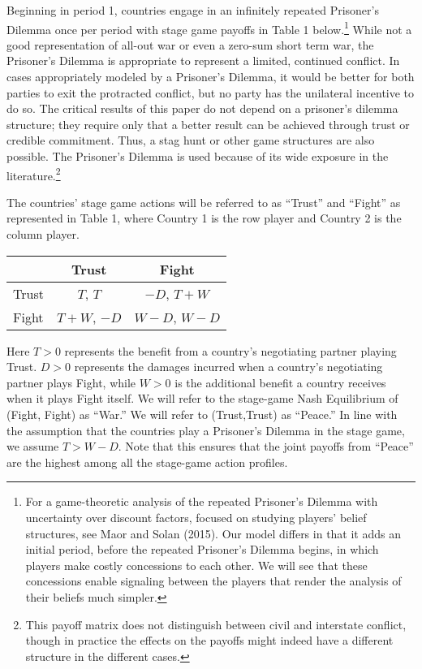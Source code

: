 \documentclass[12pt, letterpaper]{article}
\begin{document}
Beginning in period 1, countries engage in an infinitely repeated Prisoner's Dilemma once per period with stage game payoffs in Table 1 below.\footnote{For a game-theoretic analysis of the repeated Prisoner's Dilemma with uncertainty over discount factors, focused on studying players' belief structures, see Maor and Solan (2015).  Our model differs in that it adds an initial period, before the repeated Prisoner's Dilemma begins, in which players make costly concessions to each other.  We will see that these concessions enable signaling between the players that render the analysis of their beliefs much simpler.} While not a good representation of all-out war or even a zero-sum short term war, the Prisoner's Dilemma is appropriate to represent a limited, continued conflict. In cases appropriately modeled by a Prisoner's Dilemma, it would be better for both parties to exit the protracted conflict, but no party has the unilateral incentive to do so. The critical results of this paper do not depend on a prisoner's dilemma structure; they require only that a better result can be achieved through trust or credible commitment. Thus, a stag hunt or other game structures are also possible. The Prisoner's Dilemma is used because of its wide exposure in the literature.\footnote{This payoff matrix does not distinguish between civil and interstate conflict, though in practice the effects on the payoffs might indeed have a different structure in the different cases.} 

The countries' stage game actions will be referred to as ``Trust'' and ``Fight'' as represented in Table 1, where Country 1 is the row player and Country 2 is the column player.

\begin{center}
\begin{tabular}{|l|c|c|}
  \hline      & Trust & Fight \\ \hline
	 Trust& $T$, $T$& $-D$, $T+W$ \\ \hline
	Fight & $T+W$, $-D$& $W-D$, $W-D$ \\ \hline
\end{tabular}
\end{center}

Here $T>0$ represents the benefit from a country's negotiating partner playing Trust. $D>0$ represents the damages incurred when a country's negotiating partner plays Fight, while $W>0$ is the additional benefit a country receives when it plays Fight itself. We will refer to the stage-game Nash Equilibrium of (Fight, Fight) as ``War.'' We will refer to (Trust,Trust) as ``Peace.'' In line with the assumption that the countries play a Prisoner's Dilemma in the stage game, we assume $T>W-D$. Note that this ensures that the joint payoffs from ``Peace'' are the highest among all the stage-game action profiles. 
\end{document}
